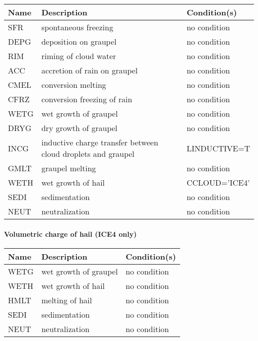 \begin{longtable} {|p{}|p{}|p{}|}
\hline
Name & Description & Condition(s) \\
\hline \hline
\endhead
SFR    & spontaneous freezing         & no condition \\\hline
DEPG   & deposition on graupel        & no condition \\\hline
RIM    & riming of cloud water        & no condition \\\hline
ACC    & accretion of rain on graupel & no condition \\\hline
CMEL   & conversion melting           & no condition \\\hline
CFRZ   & conversion freezing of rain  & no condition \\\hline
WETG   & wet growth of graupel        & no condition \\\hline
DRYG   & dry growth of graupel        & no condition \\\hline
INCG   & inductive charge transfer between cloud droplets and graupel & LINDUCTIVE=T \\\hline
GMLT   & graupel melting              & no condition \\\hline
WETH   & wet growth of hail           & CCLOUD='ICE4' \\\hline
SEDI   & sedimentation                & no condition \\\hline
NEUT   & neutralization               & no condition \\\hline
\end{longtable}

\paragraph{Volumetric charge of hail (ICE4 only)}
\mbox{} %

\begin{longtable} {|p{}|p{}|p{}|}
\hline
Name & Description & Condition(s) \\
\hline \hline
\endhead
WETG   & wet growth of graupel & no condition \\\hline
WETH   & wet growth of hail    & no condition \\\hline
HMLT   & melting of hail       & no condition \\\hline
SEDI   & sedimentation         & no condition \\\hline
NEUT   & neutralization        & no condition \\\hline
\end{longtable}

